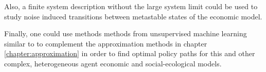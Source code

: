 Also, a finite system description without the large system limit could be used to study noise induced transitions between metastable states \citep{VandenBroeck1994, Klemm2003} of the economic model.


Finally, one could use methods methods from unsupervised machine learning similar to \cite{Strnad2019} to complement the approximation methods in chapter \ref{chapter:approximation} in order to find optimal policy paths for this and other complex, heterogeneous agent economic and social-ecological models.


